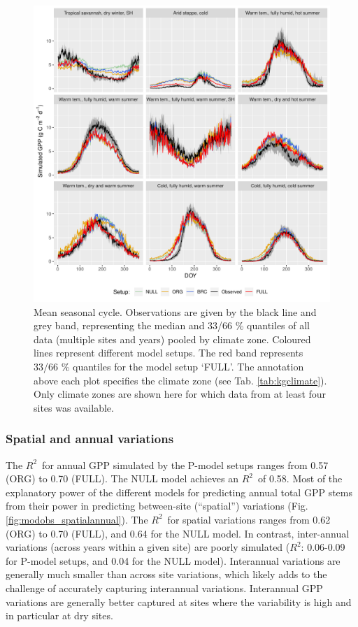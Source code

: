 \documentclass{myreport}
\newcommand{\rsq}{$R^2$}
\begin{document}
 \begin{figure}[!ht]
\includegraphics[width=\textwidth]{fig/meandoy_byzone.pdf}
\caption{Mean seasonal cycle. Observations are given by the black line and grey band, representing the median and 33/66 \% quantiles of all data (multiple sites and years) pooled by climate zone. Coloured lines represent different model setups. The red band represents 33/66 \% quantiles for the model setup `FULL'. The annotation above each plot specifies the climate zone (see Tab. \ref{tab:kgclimate}). Only climate zones are shown here for which data from at least four sites was available.}
    \label{fig:season}
\end{figure}

\clearpage

\subsubsection{Spatial and annual variations}

The \rsq\ for annual GPP simulated by the P-model setups ranges from 0.57 (ORG) to 0.70 (FULL). The NULL model achieves an \rsq\ of 0.58. Most of the explanatory power of the different models for predicting annual total GPP stems from their power in predicting between-site (``spatial'') variations (Fig. \ref{fig:modobs_spatialannual}). The \rsq\ for spatial variations ranges from 0.62 (ORG) to 0.70 (FULL), and 0.64 for the NULL model. In contrast, inter-annual  variations (across years within a given site) are poorly simulated (\rsq : 0.06-0.09 for P-model setups, and 0.04 for the NULL model). Interannual variations are generally much smaller than across site variations, which likely adds to the challenge of accurately capturing interannual variations. Interannual GPP variations are generally better captured at sites where the variability is high and in particular at dry sites. 
\end{document}
